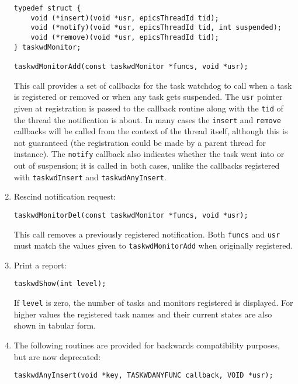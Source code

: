\begin{enumerate}
\begin{verbatim}
typedef struct {
    void (*insert)(void *usr, epicsThreadId tid);
    void (*notify)(void *usr, epicsThreadId tid, int suspended);
    void (*remove)(void *usr, epicsThreadId tid);
} taskwdMonitor;

taskwdMonitorAdd(const taskwdMonitor *funcs, void *usr);
\end{verbatim}

This call provides a set of callbacks for the task watchdog to call when a task is registered or removed or when any 
task gets suspended. The \verb|usr| pointer given at registration is passed to the callback routine along with the \verb|tid| of 
the thread the notification is about. In many cases the \verb|insert| and \verb|remove| callbacks will be called from the 
context of the thread itself, although this is not guaranteed (the registration could be made by a parent thread for 
instance). The \verb|notify| callback also indicates whether the task went into or out of suspension; it is called in both 
cases, unlike the callbacks registered with \verb|taskwdInsert| and \verb|taskwdAnyInsert|.

\item Rescind notification request:

\begin{verbatim}
taskwdMonitorDel(const taskwdMonitor *funcs, void *usr);
\end{verbatim}

This call removes a previously registered notification. Both \verb|funcs| and \verb|usr| must match the values given to 
\verb|taskwdMonitorAdd| when originally registered.

\item Print a report:

\begin{verbatim}
taskwdShow(int level);
\end{verbatim}

If \verb|level| is zero, the number of tasks and monitors registered is displayed. For higher values the registered task 
names and their current states are also shown in tabular form.

\item The following routines are provided for backwards compatibility purposes, but are now deprecated:

\begin{verbatim}
taskwdAnyInsert(void *key, TASKWDANYFUNC callback, VOID *usr);
\end{verbatim}


\end{enumerate}
